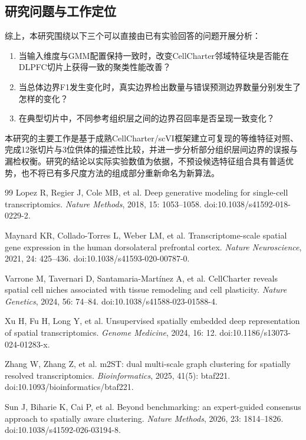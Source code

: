 \documentclass[UTF8,a4paper,12pt]{ctexart}
\begin{document}
\subsection{研究问题与工作定位}
综上，本研究围绕以下三个可以直接由已有实验回答的问题开展分析：
\begin{enumerate}
  \item 当输入维度与GMM配置保持一致时，改变CellCharter邻域特征块是否能在DLPFC切片上获得一致的聚类性能改善？
  \item 当总体边界F1发生变化时，真实边界检出数量与错误预测边界数量分别发生了怎样的变化？
  \item 在典型切片中，不同参考组织层之间的边界召回率是否呈现一致变化？
\end{enumerate}
本研究的主要工作是基于成熟CellCharter/scVI框架建立可复现的等维特征对照、完成12张切片与3位供体的描述性比较，并进一步分析部分组织层间边界的误报与漏检权衡。研究的结论以实际实验数值为依据，不预设候选特征组合具有普适优势，也不将已有多尺度方法的组成部分重新命名为新算法。

\begingroup
\raggedright
\begin{thebibliography}{99}
Lopez R, Regier J, Cole MB, et al.
Deep generative modeling for single-cell transcriptomics.
\textit{Nature Methods}, 2018, 15: 1053--1058.
doi:10.1038/s41592-018-0229-2.

Maynard KR, Collado-Torres L, Weber LM, et al.
Transcriptome-scale spatial gene expression in the human dorsolateral prefrontal cortex.
\textit{Nature Neuroscience}, 2021, 24: 425--436.
doi:10.1038/s41593-020-00787-0.

Varrone M, Tavernari D, Santamaria-Martínez A, et al.
CellCharter reveals spatial cell niches associated with tissue remodeling and cell plasticity.
\textit{Nature Genetics}, 2024, 56: 74--84.
doi:10.1038/s41588-023-01588-4.

Xu H, Fu H, Long Y, et al.
Unsupervised spatially embedded deep representation of spatial transcriptomics.
\textit{Genome Medicine}, 2024, 16: 12.
doi:10.1186/s13073-024-01283-x.

Zhang W, Zhang Z, et al.
m2ST: dual multi-scale graph clustering for spatially resolved transcriptomics.
\textit{Bioinformatics}, 2025, 41(5): btaf221.
doi:10.1093/bioinformatics/btaf221.

Sun J, Biharie K, Cai P, et al.
Beyond benchmarking: an expert-guided consensus approach to spatially aware clustering.
\textit{Nature Methods}, 2026, 23: 1814--1826.
doi:10.1038/s41592-026-03194-8.
\end{thebibliography}
\endgroup
\end{document}
